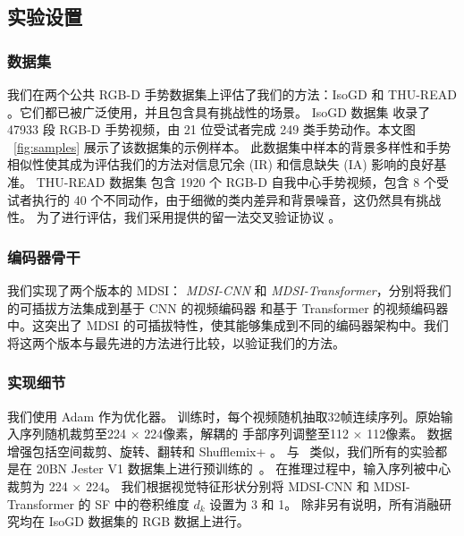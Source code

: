 \subsection{实验设置}
\subsubsection{数据集}
我们在两个公共 RGB-D 手势数据集上评估了我们的方法：IsoGD \cite{wan2016chalearn} 和 THU-READ \cite{tang2017action}。它们都已被广泛使用，并且包含具有挑战性的场景。
IsoGD 数据集 \cite{wan2016chalearn} 收录了 47933 段 RGB-D 手势视频，由 21 位受试者完成 249 类手势动作。本文图 ~\ref{fig:samples} 展示了该数据集的示例样本。
此数据集中样本的背景多样性和手势相似性使其成为评估我们的方法对信息冗余 (IR) 和信息缺失 (IA) 影响的良好基准。
THU-READ 数据集 \cite{tang2017action} 包含 1920 个 RGB-D 自我中心手势视频，包含 8 个受试者执行的 40 个不同动作，由于细微的类内差异和背景噪音，这仍然具有挑战性。
为了进行评估，我们采用提供的留一法交叉验证协议 \cite{li2021trear}。




\subsubsection{编码器骨干}
\label{sec:encoder_backbone}
我们实现了两个版本的 MDSI： \emph{MDSI-CNN} 和 \emph{MDSI-Transformer}，分别将我们的可插拔方法集成到基于 CNN 的视频编码器 \cite{zhu2018continuous} 和基于 Transformer 的视频编码器 \cite{zhou2022decoupling} 中。这突出了 MDSI 的可插拔特性，使其能够集成到不同的编码器架构中。我们将这两个版本与最先进的方法进行比较，以验证我们的方法。

\subsubsection{实现细节}
\label{sec:implementation}
我们使用 Adam 作为优化器。
训练时，每个视频随机抽取32帧连续序列。原始输入序列随机裁剪至224 $\times$ 224像素，解耦的
手部序列调整至112 $\times$ 112像素。
数据增强包括空间裁剪、旋转、翻转和 Shufflemix+ \cite{zhou2023unified}。
与~\cite{yu2021searching,zhou2021regional,zhou2022decoupling,zhou2023unified} 类似，我们所有的实验都是在 20BN Jester V1 数据集上进行预训练的~\cite{materzynska2019jester}。
在推理过程中，输入序列被中心裁剪为 224 × 224。
我们根据视觉特征形状分别将 MDSI-CNN 和 MDSI-Transformer 的 SF 中的卷积维度 $d_k$ 设置为 3 和 1。
除非另有说明，所有消融研究均在 IsoGD 数据集的 RGB 数据上进行。

